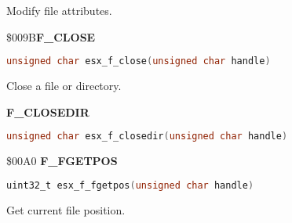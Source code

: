 Modify file attributes.

%


\$009B\textbf{F\_CLOSE}

\begin{lstlisting}[language=C]
unsigned char esx_f_close(unsigned char handle)
\end{lstlisting}

Close a file or directory.

\textbf{F\_CLOSEDIR}

\begin{lstlisting}[language=C]
unsigned char esx_f_closedir(unsigned char handle)
\end{lstlisting}

\$00A0 \textbf{F\_FGETPOS}

\begin{lstlisting}[language=C]
uint32_t esx_f_fgetpos(unsigned char handle)
\end{lstlisting}

Get current file position.


